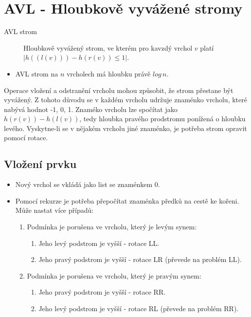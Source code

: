 \section{AVL - Hloubkově vyvážené stromy}
  \begin{description}
    \item[AVL strom] Hloubkově vyvážený strom, ve kterém pro kavzdý vrchol $v$ platí $|h((l(v))) - h(r(v)) ≤ 1|$.
  \end{description}

  \begin{itemize}
    \item AVL strom na $n$ vrcholech má hloubku právě $log \, n$.
  \end{itemize}

  Operace vložení a odstranění vrcholu mohou způsobit, že strom přestane být vyvážený.
  Z tohoto důvodu se v každém vrcholu udržuje znaménko vrcholu, které nabývá hodnot {-1, 0, 1}.
  Znaméko vrcholu lze spočítat jako $h(r(v)) - h(l(v))$, tedy hloubka pravého prodstromu ponížená o hloubku levého.
  Vyskytne-li se v nějakém vrcholu jiné znaménko, je potřeba strom opravit pomocí rotace.

  \subsection{Vložení prvku}
    \begin{itemize}
      \item Nový vrchol se vkládá jako list se znaménkem 0.
      \item Pomocí rekurze je potřeba přepočítat znaménka předků na cestě ke kořeni. Může nastat více případů:
        \begin{enumerate}
          \item Podmínka je porušena ve vrcholu, který je levým synem:
            \begin{enumerate}
              \item Jeho levý podstrom je vyšší - rotace LL.
              \item Jeho pravý podstrom je vyšší - rotace LR (převede na problém LL).
            \end{enumerate}
          \item Podmínka je porušena ve vrcholu, který je pravým synem:
            \begin{enumerate}
              \item Jeho pravý podstrom je vyšší - rotace RR.
              \item Jeho levý podstrom je vyšší - rotace RL (převede na problém RR).
            \end{enumerate}
        \end{enumerate}
    \end{itemize}
